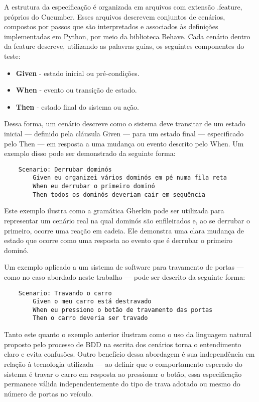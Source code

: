 A estrutura da especificação é organizada em arquivos com extensão .feature, próprios do Cucumber. Esses arquivos descrevem conjuntos de cenários, compostos por 
passos que são interpretados e associados às definições implementadas em Python, por meio da biblioteca Behave. Cada cenário dentro da feature descreve, utilizando 
as palavras guias, os seguintes componentes do teste:

\begin{itemize}
   	\item \textbf{Given} - estado inicial ou pré-condições.
   	\item \textbf{When} - evento ou transição de estado.
   	\item \textbf{Then} - estado final do sistema ou ação.
\end{itemize}

Dessa forma, um cenário descreve como o sistema deve transitar de um estado inicial — definido pela cláusula Given — para um estado final — especificado pelo 
Then — em resposta a uma mudança ou evento descrito pelo When. Um exemplo disso pode ser demonstrado da seguinte forma:

\begin{verbatim}
	Scenario: Derrubar dominós
		Given eu organizei vários dominós em pé numa fila reta
		When eu derrubar o primeiro dominó
		Then todos os dominós deveriam cair em sequência 
\end{verbatim}

Este exemplo ilustra como a gramática Gherkin pode ser utilizada para representar um cenário real na qual dominós são enfileirados e, ao se derrubar o primeiro, 
ocorre uma reação em cadeia. Ele demonstra uma clara mudança de estado que ocorre como uma resposta ao evento que é derrubar o primeiro dominó.

Um exemplo aplicado a um sistema de software para travamento de portas — como no caso abordado neste trabalho — pode ser descrito da seguinte forma:

\begin{verbatim}
	Scenario: Travando o carro
		Given o meu carro está destravado
		When eu pressiono o botão de travamento das portas
		Then o carro deveria ser travado
\end{verbatim}

Tanto este quanto o exemplo anterior ilustram como o uso da linguagem natural proposto pelo processo de BDD na escrita dos cenários torna o entendimento claro 
e evita confusões. Outro benefício dessa abordagem é sua independência em relação à tecnologia utilizada — ao definir que o comportamento esperado do sistema é 
travar o carro em resposta ao pressionar o botão, essa especificação permanece válida independentemente do tipo de trava adotado ou mesmo do número de portas no veículo.

